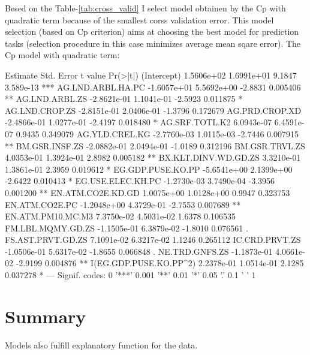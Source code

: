 \documentclass[a4paper]{article}
\begin{document}
Besed on the Table-\ref{tab:cross_valid} I select model 
obtainen by the Cp with quadratic term because of the smallest corss
validation error. This model selection (based on Cp criterion) aims at
choosing the best model for prediction tasks
(selection procedure in this case minimizes average mean sqare error). The Cp
model with quadratic term:

\begin{Schunk}
\begin{Soutput}
                          Estimate  Std. Error t value  Pr(>|t|)    
(Intercept)             1.5606e+02  1.6991e+01  9.1847 3.589e-13 ***
AG.LND.ARBL.HA.PC      -1.6057e+01  5.5692e+00 -2.8831  0.005406 ** 
AG.LND.ARBL.ZS         -2.8621e-01  1.1041e-01 -2.5923  0.011875 *  
AG.LND.CROP.ZS         -2.8151e-01  2.0406e-01 -1.3796  0.172679    
AG.PRD.CROP.XD         -2.4866e-01  1.0277e-01 -2.4197  0.018480 *  
AG.SRF.TOTL.K2          6.0943e-07  6.4591e-07  0.9435  0.349079    
AG.YLD.CREL.KG         -2.7760e-03  1.0115e-03 -2.7446  0.007915 ** 
BM.GSR.INSF.ZS         -2.0882e-01  2.0494e-01 -1.0189  0.312196    
BM.GSR.TRVL.ZS          4.0353e-01  1.3924e-01  2.8982  0.005182 ** 
BX.KLT.DINV.WD.GD.ZS    3.3210e-01  1.3861e-01  2.3959  0.019612 *  
EG.GDP.PUSE.KO.PP      -5.6541e+00  2.1399e+00 -2.6422  0.010413 *  
EG.USE.ELEC.KH.PC      -1.2730e-03  3.7490e-04 -3.3956  0.001200 ** 
EN.ATM.CO2E.KD.GD       1.0075e+00  1.0128e+00  0.9947  0.323753    
EN.ATM.CO2E.PC         -1.2048e+00  4.3729e-01 -2.7553  0.007689 ** 
EN.ATM.PM10.MC.M3       7.3750e-02  4.5031e-02  1.6378  0.106535    
FM.LBL.MQMY.GD.ZS      -1.1505e-01  6.3879e-02 -1.8010  0.076561 .  
FS.AST.PRVT.GD.ZS       7.1091e-02  6.3217e-02  1.1246  0.265112    
IC.CRD.PRVT.ZS         -1.0506e-01  5.6317e-02 -1.8655  0.066848 .  
NE.TRD.GNFS.ZS         -1.1873e-01  4.0661e-02 -2.9199  0.004876 ** 
I(EG.GDP.PUSE.KO.PP^2)  2.2378e-01  1.0514e-01  2.1285  0.037278 *  
---
Signif. codes:  0 '***' 0.001 '**' 0.01 '*' 0.05 '.' 0.1 ' ' 1
\end{Soutput}
\end{Schunk}

\section{Summary}
Models also fulfill explanatory function for the data.

\vspace{8cm}
\end{document}
